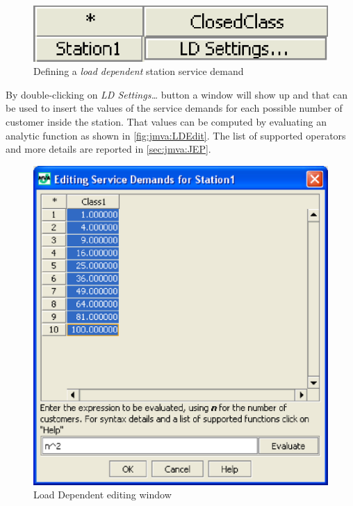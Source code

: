 \begin{figure}[htbp]
    \begin{center}
        \includegraphics[scale=.5]{img/jmva/ld}
    \end{center}
    \caption{Defining a \emph{load dependent} station service demand}
    \label{fig:jmva:LD}
\end{figure}

By double-clicking on \emph{LD Settings\dots} button a window will
show up and that can be used to insert the values of the service
demands for each possible number of customer inside the station.
That values can be computed by evaluating an analytic function as
shown in \autoref{fig:jmva:LDEdit}. The list of supported operators
and more details are reported in \autoref{sec:jmva:JEP}.

\begin{figure}[htbp]
    \begin{center}
        \includegraphics[scale=.5]{img/jmva/ldEdit}
    \end{center}
    \caption{Load Dependent editing window}
    \label{fig:jmva:LDEdit}
\end{figure}

